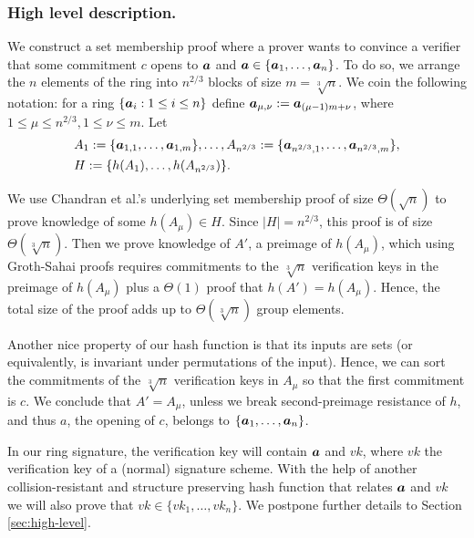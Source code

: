 \subsubsection{High level description.}
We construct a set membership proof where a prover wants to convince a verifier that some commitment $c$ opens to ${\boldsymbol{a}}$ and ${\boldsymbol{a}}\in\{{\boldsymbol{a}}_1,\ldots,{\boldsymbol{a}}_n\}$. To do so, we arrange the $n$ elements of the ring into $n^{2/3}$ blocks of size $m=\sqrt[3]{n}$. We coin the following notation: for a ring $\{{\boldsymbol{a}}_i:1\leq i \leq n\}$ define ${\boldsymbol{a}}_{\mu,\nu}:={\boldsymbol{a}}_{(\mu-1)m+\nu}$, where  $1\leq\mu\leq n^{2/3},1\leq \nu\leq m$.  Let
\begin{align*}
& A_1 := \{{\boldsymbol{a}}_{1,1},\ldots,{\boldsymbol{a}}_{1,m}\},\ldots, A_{n^{2/3}} := \{{\boldsymbol{a}}_{n^{2/3},1},\ldots,{\boldsymbol{a}}_{n^{2/3},m}\},\\
&H:=\{h(A_1),\ldots,\allowbreak h(A_{n^{2/3}})\}.
\end{align*}

We use Chandran et al.'s underlying set membership proof of size $\Theta(\sqrt{n})$ to prove knowledge of some $h(A_\mu)\in H$. Since $|H|=n^{2/3}$, this proof is of size $\Theta(\sqrt[3]{n})$. Then we prove knowledge of $A'$, a preimage of $h(A_\mu)$, which using Groth-Sahai proofs requires commitments to the $\sqrt[3]{n}$ verification keys in the preimage of $h(A_\mu)$ plus a $\Theta(1)$ proof that $h(A')=h(A_\mu)$. Hence, the total size of the proof adds up to $\Theta(\sqrt[3]{n})$ group elements.

Another nice property of our hash function is that its inputs are sets (or equivalently, is invariant under permutations of the input). Hence, we can sort the commitments of the $\sqrt[3]{n}$ verification keys in $A_\mu$ so that the first commitment is $c$. We conclude that $A'=A_\mu$, unless we break second-preimage resistance of $h$, and thus $a$, the opening of $c$, belongs to $\{{\boldsymbol{a}}_1,\ldots,{\boldsymbol{a}}_n\}$.

In our ring signature, the verification key will contain ${\boldsymbol{a}}$ and $vk$, where $vk$ the verification key of a (normal) signature scheme. With the help of another collision-resistant and structure preserving hash function that relates ${\boldsymbol{a}}$ and $vk$ we will also prove that $vk\in\{vk_1,\ldots,vk_n\}$. We postpone further details to Section \ref{sec:high-level}.
